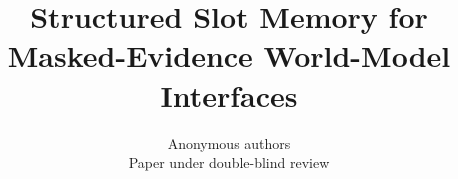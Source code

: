 \documentclass{article}
\title{Structured Slot Memory for Masked-Evidence World-Model Interfaces}
\author{Anonymous authors\\Paper under double-blind review}
\begin{document}
\maketitle
\begin{abstract}

\end{abstract}



\appendix

\end{document}
